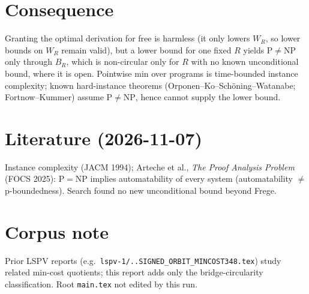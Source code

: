 \documentclass{article}
\begin{document}
\section*{Consequence}
Granting the optimal derivation for free is harmless (it only lowers $W_R$, so lower bounds on $W_R$ remain valid), but a lower bound for one fixed $R$ yields $\mathrm P\ne\mathrm{NP}$ only through $B_R$, which is non-circular only for $R$ with no known unconditional bound, where it is open. Pointwise min over programs is time-bounded instance complexity; known hard-instance theorems (Orponen--Ko--Sch\"oning--Watanabe; Fortnow--Kummer) assume $\mathrm P\ne\mathrm{NP}$, hence cannot supply the lower bound.

\section*{Literature (2026-11-07)}
Instance complexity (JACM 1994); Arteche et al., \emph{The Proof Analysis Problem} (FOCS 2025): $\mathrm P=\mathrm{NP}$ implies automatability of every system (automatability $\ne$ p-boundedness). Search found no new unconditional bound beyond Frege.

\section*{Corpus note}
Prior LSPV reports (e.g.\ \texttt{lspv-1/..SIGNED\_ORBIT\_MINCOST348.tex}) study related min-cost quotients; this report adds only the bridge-circularity classification. Root \texttt{main.tex} not edited by this run.
\end{document}
